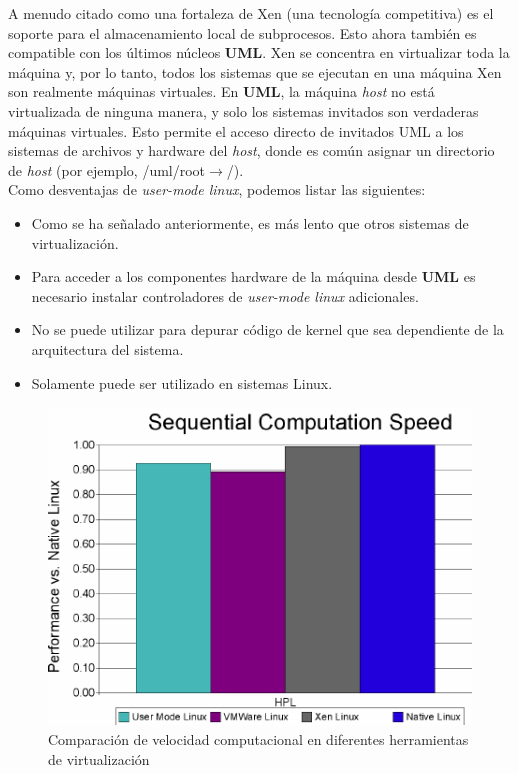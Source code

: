 \documentclass[11pt,twoside,titlepage,a4paper]{article}
\theoremstyle{definition}
\theoremstyle{plain_rojo}
\theoremstyle{remark}
\begin{document}
A menudo citado como una fortaleza de Xen (una tecnología competitiva) es el 
soporte para el almacenamiento local de subprocesos. Esto ahora también es 
compatible con los últimos núcleos \textbf{UML}. Xen se concentra en 
virtualizar toda la máquina y, por lo tanto, todos los sistemas que se 
ejecutan en una máquina Xen son realmente máquinas virtuales. En
\textbf{UML}, la máquina \emph{host} no está virtualizada de ninguna manera,
y solo los sistemas invitados son verdaderas máquinas virtuales. Esto permite 
el acceso directo de invitados UML a los sistemas de archivos y hardware del 
\emph{host}, donde es común asignar un directorio de \emph{host} (por 
ejemplo, /uml/root$\rightarrow$/).
\\

Como desventajas de \textit{user-mode linux}, podemos listar las siguientes:
\begin{itemize}[font={\color{rojooscuro}\bfseries}]
\item Como se ha señalado anteriormente, es más lento que otros sistemas de
virtualización.
\item Para acceder a los componentes hardware de la máquina desde \textbf{UML}
es necesario instalar controladores de \textit{user-mode linux} adicionales.
\item No se puede utilizar para depurar código de kernel que sea dependiente
de la arquitectura del sistema.
\item Solamente puede ser utilizado en sistemas Linux.
\end{itemize}

\begin{figure}[htp]
\centering
\includegraphics[scale=0.80]{figura_5.png}
\caption{Comparación de velocidad computacional en diferentes herramientas de virtualización}
\label{}
\end{figure}
\end{document}
